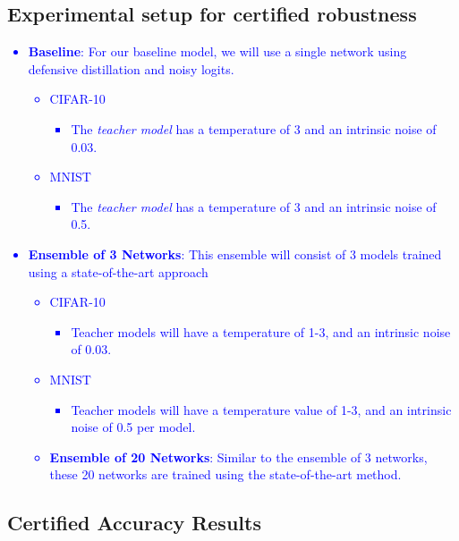 \documentclass{article}
\begin{document}
\subsection{Experimental setup for certified robustness }
\textcolor{blue}{
\begin{itemize}
    \item \textbf{Baseline}: For our baseline model, we will use a single network using defensive distillation and noisy logits. 
    \begin{itemize}
        \item CIFAR-10
        \begin{itemize}
            \item The \textit{teacher model} has a temperature of 3 and an intrinsic noise of 0.03.
        \end{itemize}
        \item MNIST
        \begin{itemize}
            \item The \textit{teacher model} has a temperature of 3 and an intrinsic noise of 0.5.
        \end{itemize}
    \end{itemize}
    \item \textbf{Ensemble of 3 Networks}: This ensemble will consist of 3 models trained using a state-of-the-art approach \cite{reference1}
    \begin{itemize}
        \item CIFAR-10
        \begin{itemize}
            \item Teacher models will have a temperature of 1-3, and an intrinsic noise of 0.03.
        \end{itemize}
        \item MNIST
        \begin{itemize}
            \item Teacher models will have a temperature value of 1-3, and an intrinsic noise of 0.5 per model.
        \end{itemize}
    \item \textbf{Ensemble of 20 Networks}: Similar to the ensemble of 3 networks, these 20 networks are trained using the state-of-the-art method. 
    \end{itemize}
\end{itemize}
}
\subsection{Certified Accuracy Results}
\end{document}
